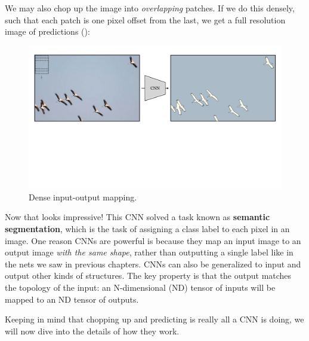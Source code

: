 We may also chop up the image into \textit{overlapping} patches. If we do this densely, such that each patch is one pixel offset from the last, we get a full resolution image of predictions (\fig{\ref{fig:convolutional_neural_nets:CNN_example_fine}}):
\begin{figure}[h]
    \centerline{
        \includegraphics[width=0.95\linewidth]{./figures/convolutional_neural_nets/CNN_example_fine.pdf}}
    \caption{Dense input-output mapping.}
    \label{fig:convolutional_neural_nets:CNN_example_fine}
\end{figure}
\vspace{-0.2cm}

Now that looks impressive! This CNN solved a task known as \textbf{semantic segmentation}, which is the task of assigning a class label to each pixel in an image. One reason CNNs are powerful is because they map an input image to an output image \textit{with the same shape}, rather than outputting a single label like in the nets we saw in previous chapters. CNNs can also be generalized to input and output other kinds of structures. The key property is that the output matches the topology of the input: an N-dimensional (ND) tensor of inputs will be mapped to an  ND tensor of outputs.%

Keeping in mind that chopping up and predicting is really all a CNN is doing, we will now dive into the details of how they work.

